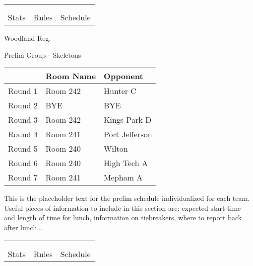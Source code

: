 \documentclass{article}%
\begin{document}
\vspace*{30pt}%
\newline%
%
\begin{tabularx}{\textwidth}{YYY}%
  &  &  \\%
\\%
Stats&Rules&Schedule\\%
\end{tabularx}%
\newpage%
%
\begin{center}%
\begin{Huge}%
Woodland Reg.%
\end{Huge}%
\vspace*{12pt}%
\linebreak%
\begin{Large}%
Prelim Group {-} Skeletons%
\end{Large}%
\end{center}%
\vspace*{4pt}%
\begin{tabularx}{\textwidth}{|c|Y|Y|}%
\hline%
&Room Name&Opponent\\%
\hline%
Round 1&Room 242&Hunter C\\%
Round 2&BYE&BYE\\%
Round 3&Room 242&Kings Park D\\%
Round 4&Room 241&Port Jefferson\\%
Round 5&Room 240&Wilton\\%
Round 6&Room 240&High Tech A\\%
Round 7&Room 241&Mepham A\\%
\hline%
\end{tabularx}%
\vspace*{30pt}%
\linebreak%
This is the placeholder text for the prelim schedule individualized for each team. Useful pieces of information to include in this section are: expected start time and length of time for lunch, information on tiebreakers, where to report back after lunch...%
\vspace*{30pt}%
\newline%
%
\begin{tabularx}{\textwidth}{YYY}%
  &  &  \\%
\\%
Stats&Rules&Schedule\\%
\end{tabularx}%
\newpage%
\end{document}
